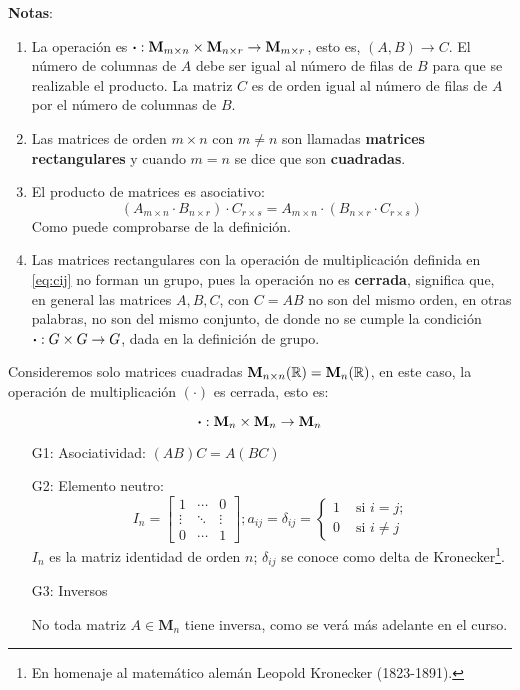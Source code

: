\textbf{Notas}:

\begin{enumerate}[label=\roman*)]
	\item La operación es $\boldsymbol{\cdot} : \textbf{M}_{m \times n} \times \mathbf{M}_{n \times r} \rightarrow \mathbf{M}_{m \times r}$, esto es, $(A, B) \rightarrow C$. El número de columnas de $A$ debe ser igual al número de filas de $B$ para que se realizable el producto. La matriz $C$ es de orden igual al número de filas de $A$ por el número de columnas de $B$.
	
	\item Las matrices de orden $m\times n$ con $m \ne n$ son llamadas \textbf{matrices rectangulares} y cuando $m = n$ se dice que son \textbf{cuadradas}.
	
	\item El producto de matrices es asociativo: \[(A_{m\times n} \cdot B_{n \times r}) \cdot C_{r \times s} = A_{m \times n} \cdot (B_{n \times r} \cdot C_{r \times s})\] Como puede comprobarse de la definición.
	
	\item Las matrices rectangulares con la operación de multiplicación definida en \eqref{eq:cij} no forman un grupo, pues la operación no es \textbf{cerrada}, significa que, en general las matrices $A, B, C$, con $C = AB$ no son del mismo orden, en otras palabras, no son del mismo conjunto, de donde no se cumple la condición $\boldsymbol{\cdot}: G \times G \rightarrow G$, dada en la definición de grupo.
\end{enumerate}

Consideremos solo matrices cuadradas $\mathbf{M}_{n \times n}(\mathbb{R}) = \mathbf{M}_n(\mathbb{R})$, en este caso, la operación de multiplicación $(\cdot)$ es cerrada, esto es:

\[ \boldsymbol{\cdot}: \mathbf{M}_n \times \mathbf{M}_n \rightarrow \mathbf{M}_n\]

\begin{itemize}
	\item[G1:] Asociatividad: $(AB)C = A(BC)$ \quad \cmark
	\item[G2:] Elemento neutro: \quad \cmark
	\[I_n = \begin{bmatrix}
		1 & \cdots & 0\\
		\vdots & \ddots & \vdots\\
		0 & \cdots & 1 
	\end{bmatrix}; a_{ij} = \delta_{ij} = \begin{cases} 1 & \mbox{ si } i = j;\\ 0 & \mbox{ si } i \ne j \end{cases} \] $I_n$ es la matriz identidad de orden $n$; $\delta_{ij}$ se conoce como delta de Kronecker\footnote{En homenaje al matemático alemán Leopold Kronecker (1823-1891).}.
	\item[G3:] Inversos \quad \xmark
	
	No toda matriz $A \in \mathbf{M}_n$ tiene inversa, como se verá más adelante en el curso.
\end{itemize}

